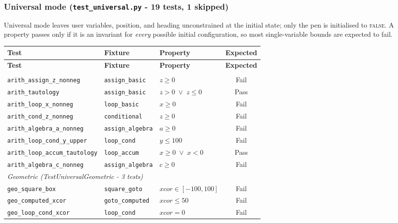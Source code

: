 \subsubsection*{Universal mode \textnormal{(\texttt{test\_universal.py} - 19 tests, 1 skipped)}}

Universal mode leaves user variables, position, and heading unconstrained at the
initial state; only the pen is initialised to \textsc{false}.
A property passes only if it is an invariant for \emph{every} possible initial
configuration, so most single-variable bounds are expected to fail.

{\small
\begin{longtable}{p{} p{} p{} c}
\toprule
\textbf{Test} & \textbf{Fixture} & \textbf{Property} & \textbf{Expected} \\
\midrule
\endfirsthead
\toprule
\textbf{Test} & \textbf{Fixture} & \textbf{Property} & \textbf{Expected} \\
\midrule
\endhead
\bottomrule
\endfoot
\bottomrule
\endlastfoot

\multicolumn{4}{l}{\textit{Arithmetic (TestUniversalArithmetic - 8 tests)}} \\
\midrule
\texttt{arith\_assign\_z\_nonneg}          & \texttt{assign\_basic}   & $z \geq 0$              & Fail \\
\texttt{arith\_tautology}                  & \texttt{assign\_basic}   & $z > 0 \;\lor\; z \leq 0$ & Pass \\
\texttt{arith\_loop\_x\_nonneg}            & \texttt{loop\_basic}     & $x \geq 0$              & Fail \\
\texttt{arith\_cond\_z\_nonneg}            & \texttt{conditional}     & $z \geq 0$              & Fail \\
\texttt{arith\_algebra\_a\_nonneg}         & \texttt{assign\_algebra} & $a \geq 0$              & Fail \\
\texttt{arith\_loop\_cond\_y\_upper}       & \texttt{loop\_cond}      & $y \leq 100$            & Fail \\
\texttt{arith\_loop\_accum\_tautology}     & \texttt{loop\_accum}     & $x \geq 0 \;\lor\; x < 0$ & Pass \\
\texttt{arith\_algebra\_c\_nonneg}         & \texttt{assign\_algebra} & $c \geq 0$              & Fail \\

\midrule
\multicolumn{4}{l}{\textit{Geometric (TestUniversalGeometric - 3 tests)}} \\
\midrule
\texttt{geo\_square\_box}                  & \texttt{square\_goto}    & $\mathit{xcor}\!\in\![-100,100]$ & Fail \\
\texttt{geo\_computed\_xcor}               & \texttt{goto\_computed}  & $\mathit{xcor} \leq 50$  & Fail \\
\texttt{geo\_loop\_cond\_xcor}             & \texttt{loop\_cond}      & $\mathit{xcor} = 0$      & Fail \\


\end{longtable}}
